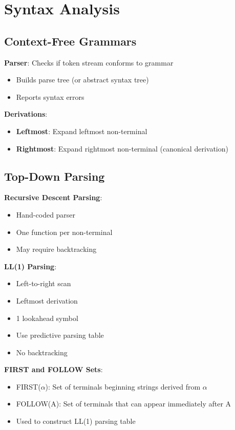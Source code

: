 \documentclass[12pt,a4paper]{report}
\begin{document}
\section{Syntax Analysis}

\subsection{Context-Free Grammars}
\begin{concept}
\textbf{Parser}: Checks if token stream conforms to grammar
\begin{itemize}
    \item Builds parse tree (or abstract syntax tree)
    \item Reports syntax errors
\end{itemize}

\textbf{Derivations}:
\begin{itemize}
    \item \textbf{Leftmost}: Expand leftmost non-terminal
    \item \textbf{Rightmost}: Expand rightmost non-terminal (canonical derivation)
\end{itemize}
\end{concept}

\subsection{Top-Down Parsing}
\begin{concept}
\textbf{Recursive Descent Parsing}:
\begin{itemize}
    \item Hand-coded parser
    \item One function per non-terminal
    \item May require backtracking
\end{itemize}

\textbf{LL(1) Parsing}:
\begin{itemize}
    \item Left-to-right scan
    \item Leftmost derivation
    \item 1 lookahead symbol
    \item Use predictive parsing table
    \item No backtracking
\end{itemize}

\textbf{FIRST and FOLLOW Sets}:
\begin{itemize}
    \item FIRST($\alpha$): Set of terminals beginning strings derived from $\alpha$
    \item FOLLOW(A): Set of terminals that can appear immediately after A
    \item Used to construct LL(1) parsing table
\end{itemize}
\end{concept}
\end{document}
